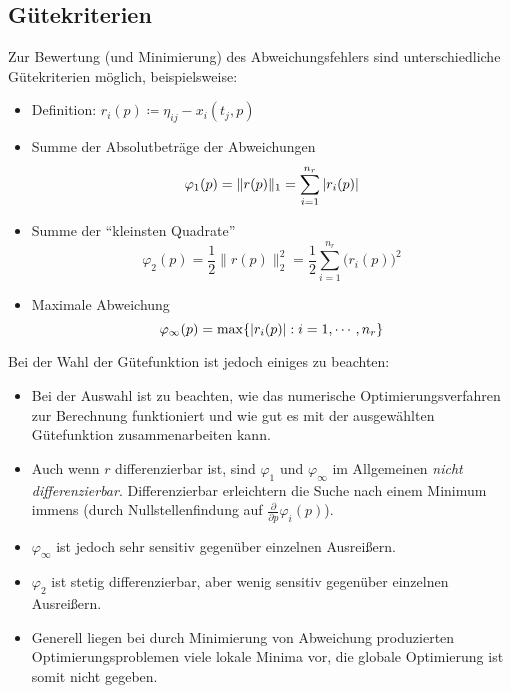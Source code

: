		\subsection{Gütekriterien} %
			Zur Bewertung (und Minimierung) des Abweichungsfehlers sind unterschiedliche Gütekriterien möglich, beispielsweise:
			\begin{itemize}
				\item Definition: \( r_i(p) \coloneqq \eta _ {ij} - x _ i (t _ j, p) \)
				\item Summe der Absolutbeträge der Abweichungen
					\begin{equation*}
						\varphi _ 1 (p) = \lVert r(p) \rVert _ 1 = \sum_{i = 1}^{n _ r} \abs{r_i(p)}
					\end{equation*}
				\item Summe der \enquote{kleinsten Quadrate}
					\begin{equation*}
						\varphi _ 2 (p) = \frac{1}{2} \lVert r(p) \rVert _ 2 ^ 2 = \frac{1}{2} \sum_{i = 1}^{n _ r} \big( r _ i (p) \big) ^ 2
					\end{equation*}
				\item Maximale Abweichung
					\begin{equation*}
						\varphi _ \infty (p) = \max \{ \abs{r _ i (p)} : i = 1, \cdots, n _ r \}
					\end{equation*}
			\end{itemize}

			Bei der Wahl der Gütefunktion ist jedoch einiges zu beachten:
			\begin{itemize}
				\item Bei der Auswahl ist zu beachten, wie das numerische Optimierungsverfahren zur Berechnung funktioniert und wie gut es mit der ausgewählten Gütefunktion zusammenarbeiten kann.
				\item Auch wenn \(r\) differenzierbar ist, sind \( \varphi_1 \) und \( \varphi_\infty \) im Allgemeinen \textit{nicht differenzierbar}. Differenzierbar erleichtern die Suche nach einem Minimum immens (durch Nullstellenfindung auf \( \frac{\partial}{\partial p} \varphi _ i (p) \)).
				\item \( \varphi _ \infty \) ist jedoch sehr sensitiv gegenüber einzelnen Ausreißern.
				\item \( \varphi _ 2 \) ist stetig differenzierbar, aber wenig sensitiv gegenüber einzelnen Ausreißern.
				\item Generell liegen bei durch Minimierung von Abweichung produzierten Optimierungsproblemen viele lokale Minima vor, die globale Optimierung ist somit nicht gegeben.
			\end{itemize}

